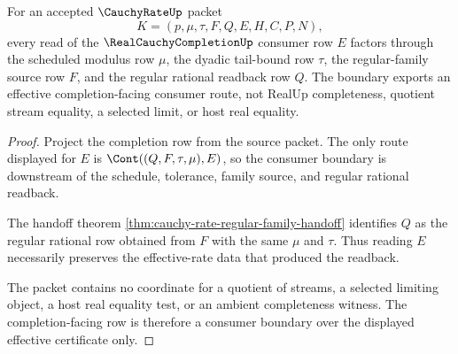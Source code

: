 \begin{theorem}
\label{thm:cauchy-rate-real-cauchy-consumer-boundary}
For an accepted $\CauchyRateUp$ packet
$$
K=(p,\mu,\tau,F,Q,E,H,C,P,N),
$$
every read of the $\RealCauchyCompletionUp$ consumer row $E$ factors through the scheduled modulus row $\mu$, the dyadic tail-bound row $\tau$, the regular-family source row $F$, and the regular rational readback row $Q$. The boundary exports an effective completion-facing consumer route, not RealUp completeness, quotient stream equality, a selected limit, or host real equality.
\end{theorem}
\begin{proof}
Project the completion row from the source packet. The only route displayed for $E$ is $\Cont((Q,F,\tau,\mu),E)$, so the consumer boundary is downstream of the schedule, tolerance, family source, and regular rational readback.

The handoff theorem \autoref{thm:cauchy-rate-regular-family-handoff} identifies $Q$ as the regular rational row obtained from $F$ with the same $\mu$ and $\tau$. Thus reading $E$ necessarily preserves the effective-rate data that produced the readback.

The packet contains no coordinate for a quotient of streams, a selected limiting object, a host real equality test, or an ambient completeness witness. The completion-facing row is therefore a consumer boundary over the displayed effective certificate only.
\end{proof}

